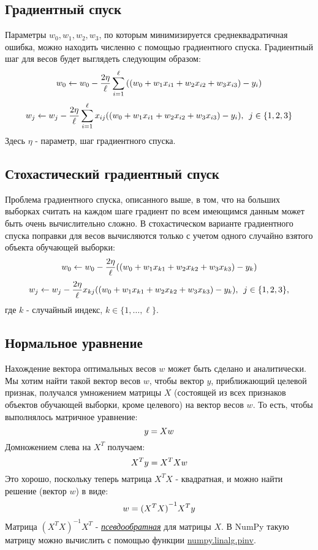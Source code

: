 \documentclass[11pt]{article}
\begin{document}
    \subsection{Градиентный
спуск}\label{ux433ux440ux430ux434ux438ux435ux43dux442ux43dux44bux439-ux441ux43fux443ux441ux43a}

Параметры \(w_0, w_1, w_2, w_3\), по которым минимизируется
среднеквадратичная ошибка, можно находить численно с помощью
градиентного спуска. Градиентный шаг для весов будет выглядеть следующим
образом:
\[\Large w_0 \leftarrow w_0 - \frac{2\eta}{\ell} \sum_{i=1}^\ell{{((w_0 + w_1x_{i1} + w_2x_{i2} +  w_3x_{i3}) - y_i)}}\]
\[\Large w_j \leftarrow w_j - \frac{2\eta}{\ell} \sum_{i=1}^\ell{{x_{ij}((w_0 + w_1x_{i1} + w_2x_{i2} +  w_3x_{i3}) - y_i)}},\ j \in \{1,2,3\}\]
Здесь \(\eta\) - параметр, шаг градиентного спуска.

    \subsection{Стохастический градиентный
спуск}\label{ux441ux442ux43eux445ux430ux441ux442ux438ux447ux435ux441ux43aux438ux439-ux433ux440ux430ux434ux438ux435ux43dux442ux43dux44bux439-ux441ux43fux443ux441ux43a}

Проблема градиентного спуска, описанного выше, в том, что на больших
выборках считать на каждом шаге градиент по всем имеющимся данным может
быть очень вычислительно сложно. В стохастическом варианте градиентного
спуска поправки для весов вычисляются только с учетом одного случайно
взятого объекта обучающей выборки:
\[\Large w_0 \leftarrow w_0 - \frac{2\eta}{\ell} {((w_0 + w_1x_{k1} + w_2x_{k2} +  w_3x_{k3}) - y_k)}\]
\[\Large w_j \leftarrow w_j - \frac{2\eta}{\ell} {x_{kj}((w_0 + w_1x_{k1} + w_2x_{k2} +  w_3x_{k3}) - y_k)},\ j \in \{1,2,3\},\]
где \(k\) - случайный индекс, \(k \in \{1, \ldots, \ell\}\).

    \subsection{Нормальное
уравнение}\label{ux43dux43eux440ux43cux430ux43bux44cux43dux43eux435-ux443ux440ux430ux432ux43dux435ux43dux438ux435}

Нахождение вектора оптимальных весов \(w\) может быть сделано и
аналитически. Мы хотим найти такой вектор весов \(w\), чтобы вектор
\(y\), приближающий целевой признак, получался умножением матрицы \(X\)
(состоящей из всех признаков объектов обучающей выборки, кроме целевого)
на вектор весов \(w\). То есть, чтобы выполнялось матричное уравнение:
\[\Large y = Xw\] Домножением слева на \(X^T\) получаем:
\[\Large X^Ty = X^TXw\] Это хорошо, поскольку теперь матрица \(X^TX\) -
квадратная, и можно найти решение (вектор \(w\)) в виде:
\[\Large w = {(X^TX)}^{-1}X^Ty\] Матрица \({(X^TX)}^{-1}X^T\) -
\href{https://ru.wikipedia.org/wiki/Псевдообратная_матрица}{\emph{псевдообратная}}
для матрицы \(X\). В NumPy такую матрицу можно вычислить с помощью
функции
\href{http://docs.scipy.org/doc/numpy-1.10.0/reference/generated/numpy.linalg.pinv.html}{numpy.linalg.pinv}.
\end{document}

